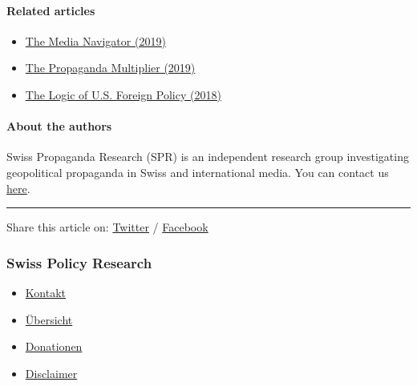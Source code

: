 \hypertarget{related-articles}{%
\paragraph{Related articles}\label{related-articles}}

\begin{itemize}
\tightlist
\item
  \href{https://swprs.org/media-navigator/}{The Media Navigator (2019)}
\item
  \href{https://swprs.org/the-propaganda-multiplier/}{The Propaganda
  Multiplier (2019)}
\item
  \href{https://swprs.org/us-foreign-policy/}{The Logic of U.S. Foreign
  Policy (2018)}
\end{itemize}

\hypertarget{about-the-authors}{%
\paragraph{About the authors}\label{about-the-authors}}

Swiss Propaganda Research (SPR) is an independent research group
investigating geopolitical propaganda in Swiss and international media.
You can contact us \href{https://swprs.org/contact/}{here}.

\begin{center}\rule{0.5\linewidth}{\linethickness}\end{center}

Share this article on:
\href{https://twitter.com/intent/tweet?url=https://swprs.org/the-american-empire-and-its-media/}{Twitter}
/
\href{https://www.facebook.com/share.php?u=https://swprs.org/the-american-empire-and-its-media/}{Facebook}

\hypertarget{swiss-policy-research}{%
\subsubsection{Swiss Policy Research}\label{swiss-policy-research}}

\begin{itemize}
\tightlist
\item
  \href{https://swprs.org/kontakt/}{Kontakt}
\item
  \href{https://swprs.org/uebersicht/}{Übersicht}
\item
  \href{https://swprs.org/donationen/}{Donationen}
\item
  \href{https://swprs.org/disclaimer/}{Disclaimer}
\end{itemize}

